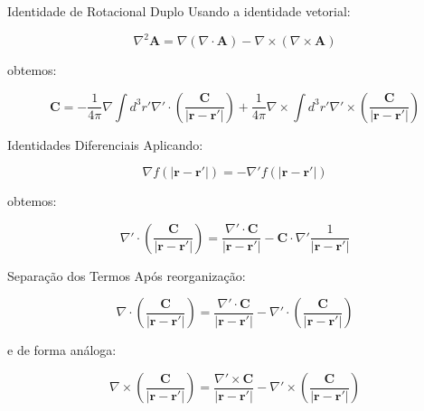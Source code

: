 \documentclass[aspectratio=169]{beamer}
\begin{document}
\begin{frame}{Identidade de Rotacional Duplo}
Usando a identidade vetorial:

\begin{equation}
\nabla^2 \mathbf{A} =
\nabla(\nabla \cdot \mathbf{A}) -
\nabla \times (\nabla \times \mathbf{A})
\end{equation}

obtemos:

\begin{equation}
\mathbf{C} =
-\frac{1}{4\pi} \nabla \int d^3 r' \nabla' \cdot \left(\frac{\mathbf{C}}{|\mathbf{r}-\mathbf{r}'|}\right)
+ \frac{1}{4\pi} \nabla \times \int d^3 r' \nabla' \times \left(\frac{\mathbf{C}}{|\mathbf{r}-\mathbf{r}'|}\right)
\end{equation}
\end{frame}

\begin{frame}{Identidades Diferenciais}
Aplicando:

\begin{equation}
\nabla f(|\mathbf{r}-\mathbf{r}'|) = -\nabla' f(|\mathbf{r}-\mathbf{r}'|)
\end{equation}

obtemos:

\begin{equation}
\nabla' \cdot \left(\frac{\mathbf{C}}{|\mathbf{r}-\mathbf{r}'|}\right)
=
\frac{\nabla' \cdot \mathbf{C}}{|\mathbf{r}-\mathbf{r}'|}
-
\mathbf{C} \cdot \nabla' \frac{1}{|\mathbf{r}-\mathbf{r}'|}
\end{equation}
\end{frame}

\begin{frame}{Separação dos Termos}
Após reorganização:

\begin{equation}
\nabla \cdot \left(\frac{\mathbf{C}}{|\mathbf{r}-\mathbf{r}'|}\right)
=
\frac{\nabla' \cdot \mathbf{C}}{|\mathbf{r}-\mathbf{r}'|}
-
\nabla' \cdot \left(\frac{\mathbf{C}}{|\mathbf{r}-\mathbf{r}'|}\right)
\end{equation}

e de forma análoga:

\begin{equation}
\nabla \times \left(\frac{\mathbf{C}}{|\mathbf{r}-\mathbf{r}'|}\right)
=
\frac{\nabla' \times \mathbf{C}}{|\mathbf{r}-\mathbf{r}'|}
-
\nabla' \times \left(\frac{\mathbf{C}}{|\mathbf{r}-\mathbf{r}'|}\right)
\end{equation}
\end{frame}
\end{document}
